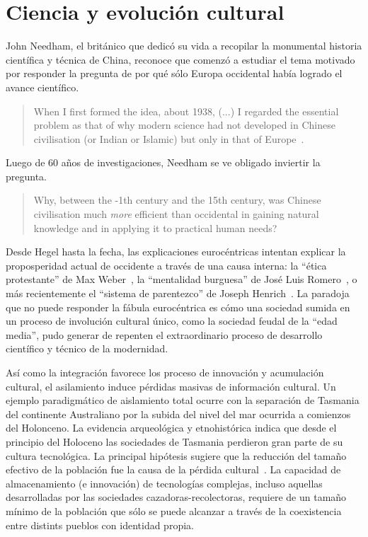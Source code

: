\documentclass[a4paper,10pt]{book}
\theoremstyle{definition}
\begin{document}

\section{Ciencia y evolución cultural}

John Needham, el británico que dedicó su vida a recopilar la monumental historia científica y técnica de China, reconoce que comenzó a estudiar el tema motivado por responder la pregunta de por qué sólo Europa occidental había logrado el avance científico.
\begin{quotation}
When I first formed the idea, about 1938, (...) I regarded the essential problem as that of why modern science had not developed in Chinese civilisation (or Indian or Islamic) but only in that of Europe~\cite{needham2004-generalConclusionsAndReflections}.%
\end{quotation}
Luego de 60 años de investigaciones, Needham se ve obligado inviertir la pregunta.
\begin{quotation}
Why, between the -1th century and the 15th century, was Chinese civilisation much \emph{more} efficient than occidental in gaining natural knowledge and in applying it to practical human needs?~\cite{needham2004-generalConclusionsAndReflections}
\end{quotation}


Desde Hegel hasta la fecha, las explicaciones eurocéntricas intentan explicar la proposperidad actual de occidente a través de una causa interna: la ``ética protestante'' de Max Weber~\cite{weber1905-eticaProtestante}, la ``mentalidad burguesa'' de José Luis Romero~\cite{romero1967-revolucionBurguesa}, o más recientemente el ``sistema de parentezco'' de Joseph Henrich~\cite{henrich2020-weirdest}.
La paradoja que no puede responder la fábula eurocéntrica es cómo una sociedad sumida en un proceso de involución cultural único, como la sociedad feudal de la ``edad media'', pudo generar de repenten el extraordinario proceso de desarrollo científico y técnico de la modernidad.


Así como la integración favorece los proceso de innovación y acumulación cultural, el asilamiento induce pérdidas masivas de información cultural.
%
Un ejemplo paradigmático de aislamiento total ocurre con la separación de Tasmania del continente Australiano por la subida del nivel del mar ocurrida a comienzos del Holonceno.
%
La evidencia arqueológica y etnohistórica indica que desde el principio del Holoceno las sociedades de Tasmania perdieron gran parte de su cultura tecnológica.
La principal hipótesis sugiere que la reducción del tamaño efectivo de la población fue la causa de la pérdida cultural~\cite{Henrich2004}.
%
La capacidad de almacenamiento (e innovación) de tecnologías complejas, incluso aquellas desarrolladas por las sociedades cazadoras-recolectoras, requiere de un tamaño mínimo de la población que sólo se puede alcanzar a través de la coexistencia entre distints pueblos con identidad propia.
\end{document}
